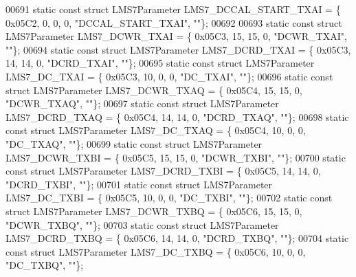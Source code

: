 \begin{DoxyCode}
00691 \textcolor{keyword}{static} \textcolor{keyword}{const} \textcolor{keyword}{struct }LMS7Parameter LMS7_DCCAL_START_TXAI = \{ 0x05C2, 0, 0, 0, \textcolor{stringliteral}{"DCCAL\_START\_TXAI"}, \textcolor{stringliteral}{""}\};
00692 
00693 \textcolor{keyword}{static} \textcolor{keyword}{const} \textcolor{keyword}{struct }LMS7Parameter LMS7_DCWR_TXAI = \{ 0x05C3, 15, 15, 0, \textcolor{stringliteral}{"DCWR\_TXAI"}, \textcolor{stringliteral}{""}\};
00694 \textcolor{keyword}{static} \textcolor{keyword}{const} \textcolor{keyword}{struct }LMS7Parameter LMS7_DCRD_TXAI = \{ 0x05C3, 14, 14, 0, \textcolor{stringliteral}{"DCRD\_TXAI"}, \textcolor{stringliteral}{""}\};
00695 \textcolor{keyword}{static} \textcolor{keyword}{const} \textcolor{keyword}{struct }LMS7Parameter LMS7_DC_TXAI = \{ 0x05C3, 10, 0, 0, \textcolor{stringliteral}{"DC\_TXAI"}, \textcolor{stringliteral}{""}\};
00696 \textcolor{keyword}{static} \textcolor{keyword}{const} \textcolor{keyword}{struct }LMS7Parameter LMS7_DCWR_TXAQ = \{ 0x05C4, 15, 15, 0, \textcolor{stringliteral}{"DCWR\_TXAQ"}, \textcolor{stringliteral}{""}\};
00697 \textcolor{keyword}{static} \textcolor{keyword}{const} \textcolor{keyword}{struct }LMS7Parameter LMS7_DCRD_TXAQ = \{ 0x05C4, 14, 14, 0, \textcolor{stringliteral}{"DCRD\_TXAQ"}, \textcolor{stringliteral}{""}\};
00698 \textcolor{keyword}{static} \textcolor{keyword}{const} \textcolor{keyword}{struct }LMS7Parameter LMS7_DC_TXAQ = \{ 0x05C4, 10, 0, 0, \textcolor{stringliteral}{"DC\_TXAQ"}, \textcolor{stringliteral}{""}\};
00699 \textcolor{keyword}{static} \textcolor{keyword}{const} \textcolor{keyword}{struct }LMS7Parameter LMS7_DCWR_TXBI = \{ 0x05C5, 15, 15, 0, \textcolor{stringliteral}{"DCWR\_TXBI"}, \textcolor{stringliteral}{""}\};
00700 \textcolor{keyword}{static} \textcolor{keyword}{const} \textcolor{keyword}{struct }LMS7Parameter LMS7_DCRD_TXBI = \{ 0x05C5, 14, 14, 0, \textcolor{stringliteral}{"DCRD\_TXBI"}, \textcolor{stringliteral}{""}\};
00701 \textcolor{keyword}{static} \textcolor{keyword}{const} \textcolor{keyword}{struct }LMS7Parameter LMS7_DC_TXBI = \{ 0x05C5, 10, 0, 0, \textcolor{stringliteral}{"DC\_TXBI"}, \textcolor{stringliteral}{""}\};
00702 \textcolor{keyword}{static} \textcolor{keyword}{const} \textcolor{keyword}{struct }LMS7Parameter LMS7_DCWR_TXBQ = \{ 0x05C6, 15, 15, 0, \textcolor{stringliteral}{"DCWR\_TXBQ"}, \textcolor{stringliteral}{""}\};
00703 \textcolor{keyword}{static} \textcolor{keyword}{const} \textcolor{keyword}{struct }LMS7Parameter LMS7_DCRD_TXBQ = \{ 0x05C6, 14, 14, 0, \textcolor{stringliteral}{"DCRD\_TXBQ"}, \textcolor{stringliteral}{""}\};
00704 \textcolor{keyword}{static} \textcolor{keyword}{const} \textcolor{keyword}{struct }LMS7Parameter LMS7_DC_TXBQ = \{ 0x05C6, 10, 0, 0, \textcolor{stringliteral}{"DC\_TXBQ"}, \textcolor{stringliteral}{""}\};

\end{DoxyCode}
